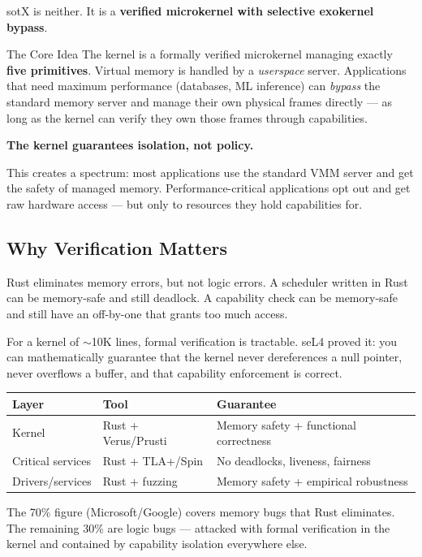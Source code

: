 \documentclass[11pt,a4paper]{article}
\begin{document}
sotX is neither. It is a \textbf{verified microkernel with selective exokernel bypass}.

\begin{principalbox}{The Core Idea}
The kernel is a formally verified microkernel managing exactly \textbf{five primitives}.
Virtual memory is handled by a \textit{userspace} server.
Applications that need maximum performance (databases, ML inference) can
\textit{bypass} the standard memory server and manage their own physical frames
directly --- as long as the kernel can verify they own those frames through capabilities.

\textbf{The kernel guarantees isolation, not policy.}
\end{principalbox}

This creates a spectrum: most applications use the standard VMM server and
get the safety of managed memory. Performance-critical applications opt out
and get raw hardware access --- but only to resources they hold capabilities for.

\subsection{Why Verification Matters}

Rust eliminates memory errors, but not logic errors. A scheduler written in Rust
can be memory-safe and still deadlock. A capability check can be memory-safe
and still have an off-by-one that grants too much access.

For a kernel of $\sim$10K lines, formal verification is tractable. seL4 proved it:
you can mathematically guarantee that the kernel never dereferences a null pointer,
never overflows a buffer, and that capability enforcement is correct.

\begin{center}
\begin{tabular}{lll}
\toprule
\textbf{Layer} & \textbf{Tool} & \textbf{Guarantee} \\
\midrule
Kernel          & Rust + Verus/Prusti     & Memory safety + functional correctness \\
Critical services & Rust + TLA+/Spin     & No deadlocks, liveness, fairness \\
Drivers/services  & Rust + fuzzing       & Memory safety + empirical robustness \\
\bottomrule
\end{tabular}
\end{center}

The 70\% figure (Microsoft/Google) covers memory bugs that Rust eliminates.
The remaining 30\% are logic bugs --- attacked with formal verification in the kernel
and contained by capability isolation everywhere else.
\end{document}
